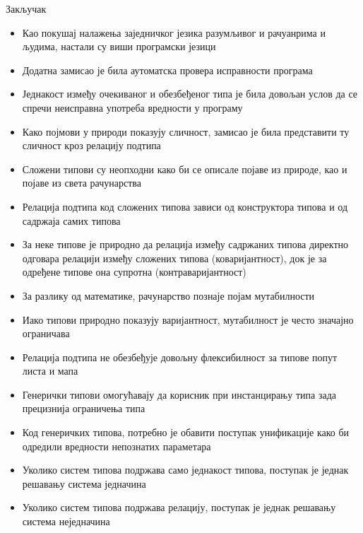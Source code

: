 \documentclass[xcolor=table]{beamer}
\begin{document}
    \begin{frame}[allowframebreaks]{Закључак}
        \begin{itemize}
            \item Као покушај налажења заједничког језика разумљивог и рачуанрима и људима, настали су виши програмски језици
            \item Додатна замисао је била аутоматска провера исправности програма
            \item Једнакост између очекиваног и обезбеђеног типа је била довољан услов да се спречи неисправна употреба вредности у програму
            \item Како појмови у природи показују сличност, замисао је била представити ту сличност кроз релацију подтипа
        \end{itemize}
        
        \framebreak
        
        \begin{itemize}
            \item Сложени типови су неопходни како би се описале појаве из природе, као и појаве из света рачунарства
            \item Релација подтипа код сложених типова зависи од конструктора типова и од садржаја самих типова
            \item За неке типове је природно да релација између садржаних типова директно одговара релацији између сложених типова (коваријантност), док је за одређене типове она супротна (контраваријантност)
            \item За разлику од математике, рачунарство познаје појам мутабилности
            \item Иако типови природно показују варијантност, мутабилност је често значајно ограничава
        \end{itemize}
        
        \framebreak
        
        \begin{itemize}
            \item Релација подтипа не обезбеђује довољну флексибилност за типове попут листа и мапа
            \item Генерички типови омогућавају да корисник при инстанцирању типа зада прецизнија ограничења типа
            \item Код генеричких типова, потребно је обавити поступак унификације како би одредили вредности непознатих параметара
            \item Уколико систем типова подржава само једнакост типова, поступак је једнак решавању система једначина
            \item Уколико систем типова подржава релацију, поступак је једнак решавању система неједначина
        \end{itemize}
    \end{frame}
    
\end{document}
